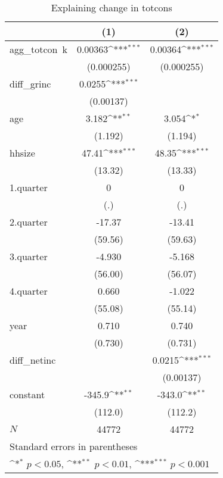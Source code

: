 \begin{table}[htbp]\centering
\def\sym#1{\ifmmode^{#1}\else\(^{#1}\)\fi}
\caption{\label{totcons\_deltacons} Explaining change in totcons}
\begin{tabular}{l*{2}{c}}
\hline\hline
            &\multicolumn{1}{c}{(1)}         &\multicolumn{1}{c}{(2)}         \\
\hline
agg\_totcon~k&     0.00363\sym{***}&     0.00364\sym{***}\\
            &  (0.000255)         &  (0.000255)         \\
diff\_grinc  &      0.0255\sym{***}&                     \\
            &   (0.00137)         &                     \\
age         &       3.182\sym{**} &       3.054\sym{*}  \\
            &     (1.192)         &     (1.194)         \\
hhsize      &       47.41\sym{***}&       48.35\sym{***}\\
            &     (13.32)         &     (13.33)         \\
1.quarter   &           0         &           0         \\
            &         (.)         &         (.)         \\
2.quarter   &      -17.37         &      -13.41         \\
            &     (59.56)         &     (59.63)         \\
3.quarter   &      -4.930         &      -5.168         \\
            &     (56.00)         &     (56.07)         \\
4.quarter   &       0.660         &      -1.022         \\
            &     (55.08)         &     (55.14)         \\
year        &       0.710         &       0.740         \\
            &     (0.730)         &     (0.731)         \\
diff\_netinc &                     &      0.0215\sym{***}\\
            &                     &   (0.00137)         \\
constant    &      -345.9\sym{**} &      -343.0\sym{**} \\
            &     (112.0)         &     (112.2)         \\
\hline
\(N\)       &       44772         &       44772         \\
\hline\hline
\multicolumn{3}{l}{\footnotesize Standard errors in parentheses}\\
\multicolumn{3}{l}{\footnotesize \sym{*} \(p<0.05\), \sym{**} \(p<0.01\), \sym{***} \(p<0.001\)}\\
\end{tabular}
\end{table}
